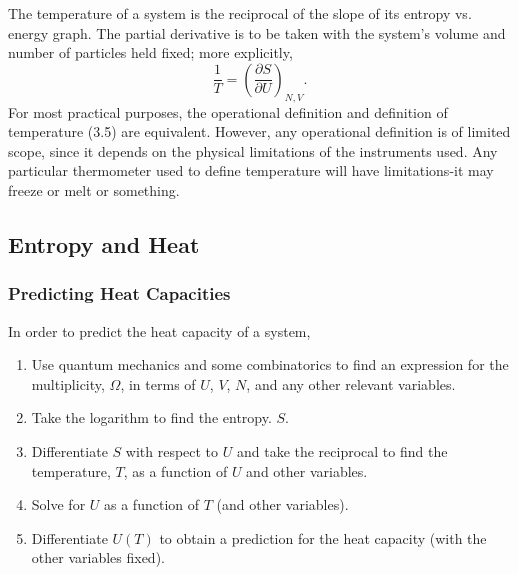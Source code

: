 \documentclass[11pt]{exam}
\begin{document}
\hspace*{10mm}The temperature of a system is the reciprocal of the slope of its entropy vs. energy graph. The partial derivative is to be taken with the system's volume and number of particles held fixed; more explicitly, 
\begin{equation}\tag{3.5}
\frac{1}{T} = \left(\frac{\partial S}{\partial U}\right)_{N,V}.
\end{equation}
For most practical purposes, the operational definition and definition of temperature (3.5) are equivalent. However, any operational definition is of limited scope, since it depends on the physical limitations of the instruments used. Any particular thermometer used to define temperature will have limitations-it may freeze or melt or something. 
\newpage
\subsection{Entropy and Heat}
\subsubsection*{Predicting Heat Capacities}
In order to predict the heat capacity of a system, 
\begin{enumerate}
\item Use quantum mechanics and some combinatorics to find an expression for the multiplicity, $\Omega$, in terms of $U$, $V$, $N$, and any other relevant variables. 
\item Take the logarithm to find the entropy. $S$.
\item Differentiate $S$ with respect to $U$ and take the reciprocal to find the temperature, $T$, as a function of $U$ and other variables. 
\item Solve for $U$ as a function of $T$ (and other variables). 
\item Differentiate $U(T)$ to obtain a prediction for the heat capacity (with the other variables fixed). 
\end{enumerate}
\newpage
\end{document}
